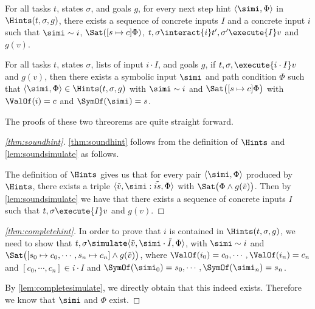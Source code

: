 \begin{theorem}
  \label{thm:soundhint}
  For all tasks $t$, states $\sigma$, and goals $g$,
  for every next step hint $\<\simi,\Phi\>$ in $\Hints(t,\sigma,g)$,
  there exists a sequence of concrete inputs $I$ and a concrete input $i$ such that $\simi\sim i$,
  $\Sat([s\mapsto c]\Phi)$, $t,\sigma\interact{i} t',\sigma'\execute{I} v$ and $g(v)$.
\end{theorem}

\begin{theorem}
  \label{thm:completehint}
  For all tasks $t$, states $\sigma$, lists of input $i \cdot I$, and goals $g$,
  if $t,\sigma,\execute{i \cdot I} v$ and $g(v)$, then there exists a symbolic input $\simi$ and path condition $\Phi$
  such that $\<\simi,\Phi\> \in \Hints(t,\sigma,g)$ with $\simi\sim i$ and $\Sat\big([s\mapsto c]\Phi\big)$ with $\ValOf(i) = c$ and $\SymOf(\simi) = s$.
\end{theorem}

The proofs of these two threorems are quite straight forward.

\begin{proof}[\cref{thm:soundhint}]
  \cref{thm:soundhint} follows from the definition of $\Hints$ and \cref{lem:soundsimulate} as follows.

  The definition of $\Hints$ gives us that for every pair $\<\simi,\Phi\>$ produced by $\Hints$,
  there exists a triple $\<\tilde{v},\simi:\tilde{is},\Phi\>$ with $\Sat\big(\Phi \land g(\tilde{v})\big)$.
  Then by \cref{lem:soundsimulate} we have that there exists a sequence of concrete inputs $I$ such that
  $t,\sigma\execute{I}v$ and $g(v)$.
\end{proof}


\begin{proof}[\cref{thm:completehint}]
  In order to prove that $i$ is contained in $\Hints(t,\sigma,g)$, we need to show that $t,\sigma \simulate \<\tilde{v},\simi \cdot \tilde{I},\Phi\>$, with $\simi\sim i$ and $\Sat\big([s_0\mapsto c_0,\cdots,s_n\mapsto c_n] \land g(\tilde{v})\big)$, where $\ValOf(i_0)= c_0, \cdots, \ValOf(i_n) = c_n$ and $[c_0,\cdots,c_n]\in i \cdot I$ and $\SymOf(\simi_0) = s_0, \cdots, \SymOf(\simi_n) = s_n$.

  By \cref{lem:completesimulate}, we directly obtain that this indeed exists. Therefore we know that $\simi$ and $\Phi$ exist.
\end{proof}
